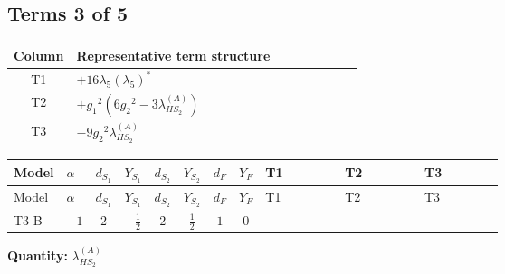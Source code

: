 \documentclass[8pt]{article}
\begin{document}
\begin{landscape}
\subsection*{Terms 3 of 5}
\begin{center}
\begin{tabular}{@{}c >{\raggedright\arraybackslash}p{0.82\linewidth}@{}}
\toprule
Column & Representative term structure \\
\midrule
T1 & \(\displaystyle +16 {\lambda_5} \left({\lambda_5}\right)^{*}\) \\
\midrule
T2 & \(\displaystyle +{g_1}^2 \left(6 {g_2}^2-3 {\lambda_{HS_2}^{(A)}}\right)\) \\
\midrule
T3 & \(\displaystyle -9 {g_2}^2 {\lambda_{HS_2}^{(A)}}\) \\
\midrule
\bottomrule
\end{tabular}
\end{center}
\smallskip
\tiny
\begin{longtable}{@{}llcccccc >{\raggedright\arraybackslash}p{0.21\linewidth} >{\raggedright\arraybackslash}p{0.21\linewidth} >{\raggedright\arraybackslash}p{0.21\linewidth}@{}}
\toprule
Model & $\alpha$ & $d_{S_1}$ & $Y_{S_1}$ & $d_{S_2}$ & $Y_{S_2}$ & $d_F$ & $Y_F$ & T1 & T2 & T3 \\
\midrule
\endfirsthead
\toprule
Model & $\alpha$ & $d_{S_1}$ & $Y_{S_1}$ & $d_{S_2}$ & $Y_{S_2}$ & $d_F$ & $Y_F$ & T1 & T2 & T3 \\
\midrule
\endhead
T3-B & $-1$ & $2$ & $-\frac{1}{2}$ & $2$ & $\frac{1}{2}$ & $1$ & $0$ & \scriptsize\adjustbox{max width=\linewidth}{$\begin{gathered} +16 {\lambda_5} \left({\lambda_5}\right)^{*}\end{gathered}$} & \scriptsize\adjustbox{max width=\linewidth}{$\begin{gathered} +{g_1}^2 \left(6 {g_2}^2-3 {\lambda_{HS_2}^{(A)}}\right)\end{gathered}$} & \scriptsize\adjustbox{max width=\linewidth}{$\begin{gathered} -9 {g_2}^2 {\lambda_{HS_2}^{(A)}}\end{gathered}$} \\
\midrule
\bottomrule
\end{longtable}
\clearpage
\noindent\textbf{Quantity: }$\lambda_{HS_2}^{(A)}$\par\smallskip

\end{landscape}
\end{document}

